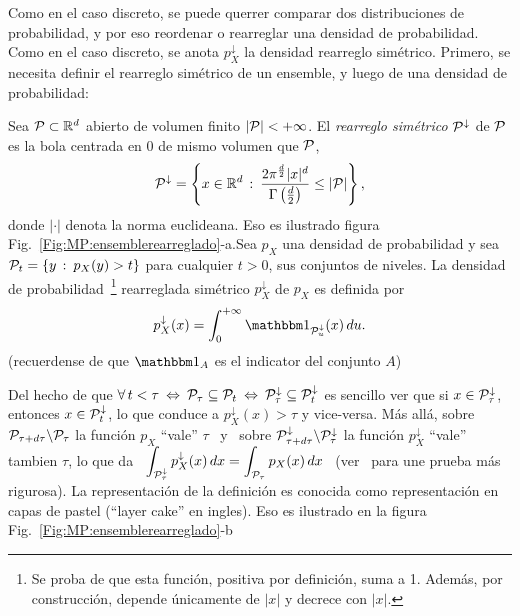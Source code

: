Como  en el  caso  discreto, se  puede  querrer comparar  dos distribuciones  de
probabilidad, y  por eso  reordenar o rearreglar  una densidad  de probabilidad.
Como  en el  caso  discreto,  se anota  $p_X^\downarrow$  la densidad  rearreglo
sim\'etrico.  Primero,  se  necesita  definir  el rearreglo  sim\'etrico  de  un
ensemble, y luego de una densidad de probabilidad:
%
\begin{definicion}\label{Def:MP:rearreglo}
  Sea $\P \subset \Rset^d$ abierto de  volumen finito $|\P| < +\infty$.  El {\it
    rearreglo sim\'etrico} $\P^\downarrow$  de $\P$ es la bola  centrada en 0 de
  mismo volumen que $\P$, \ie
  \[
  \P^\downarrow  = \left\{  x  \in  \Rset^d \,  :  \: \frac{2  \pi^{\frac{d}{2}}
      |x|^d}{\Gamma\left(\frac{d}{2}\right)} \le |\P| \right\},
  \]
  donde  $|\cdot|$  denota  la   norma  euclideana.   Eso  es  ilustrado  figura
  Fig.~\ref{Fig:MP:ensemblerearreglado}-a.\newline  Sea  $p_X$  una densidad  de
  probabilidad y sea $\P_t = \{ y \, : \: p_X(y) > t \}$ para cualquier $t > 0$,
  sus conjuntos  de niveles.  La densidad de  probabilidad~\footnote{Se proba de
    que  esta funci\'on,  positiva por  definici\'on, suma  a 1.   Adem\'as, por
    construcci\'on,  depende  \'unicamente  de   $|x|$  y  decrece  con  $|x|$.}
  rearreglada sim\'etrico $p^\downarrow_X$ de $p_X$ es definida por
  \[
  p^\downarrow_X(x)  =  \int_0^{+\infty}  \un_{\P_u^\downarrow}(x) \,  du.
  \]
  (recuerdense de que $\un_A$ es el indicator  del conjunto $A$)
\end{definicion}
%
Del hecho  de que $\forall \, t  < \tau \: \Leftrightarrow  \: \P_\tau \subseteq
\P_t  \:  \Leftrightarrow \:  \P_\tau^\downarrow  \subseteq \P_t^\downarrow$  es
sencillo   ver   que   si   $x   \in  \P_\tau^\downarrow$,   entonces   $x   \in
\P_t^\downarrow$,  lo que  conduce a  $p_X^\downarrow(x) >  \tau$  y vice-versa.
M\'as  all\'a, sobre  $\P_{\tau+d\tau}  \backslash \P_\tau$  la funci\'on  $p_X$
``vale''   $\tau$   \   y   \   sobre   $\P_{\tau+d\tau}^\downarrow   \backslash
\P_\tau^\downarrow$  la funci\'on $p_X^\downarrow$  ``vale'' tambien  $\tau$, lo
que  da \  $\displaystyle  \int_{\P_\tau^\downarrow} p_X^\downarrow(x)  \, dx  =
\int_{\P_\tau} p_X(x)  \, dx$ \  (ver~\cite{LieLos01, WanMad04} para  une prueba
m\'as  rigurosa).   La representaci\'on  de  la  definici\'on  es conocida  como
representaci\'on  en  capas  de  pastel  (``layer cake''  en  ingles).   Eso  es
ilustrado en la figura Fig.~\ref{Fig:MP:ensemblerearreglado}-b

